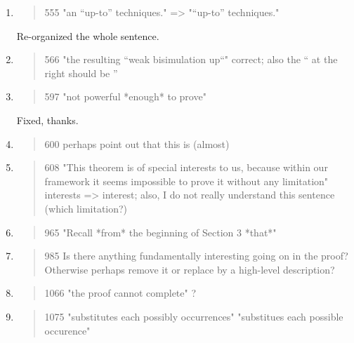 \begin{enumerate}
  \item \begin{quote}
555 "an “up-to” techniques." => "“up-to” techniques."
\end{quote}
  \Mark Re-organized the whole sentence.

  \item \begin{quote}
566 "the resulting ``weak bisimulation up``" correct; also the `` at the right should be ''
\end{quote}
  \Mark

  \item \begin{quote}
597 "not powerful *enough* to prove" 
\end{quote}
  \Mark Fixed, thanks.

  \item \begin{quote}
600 perhaps point out that this is (almost) 
\end{quote}
  \Mark

  \item \begin{quote}
608 "This theorem is of special interests to us, because within our framework it seems impossible to prove it without any limitation" interests => interest; also, I do not really understand this sentence (which limitation?)
\end{quote}
  \Mark

  \item \begin{quote}
965 "Recall *from* the beginning of Section 3 *that*"
\end{quote}
  \Mark

  \item \begin{quote}
985 Is there anything fundamentally interesting going on in the proof? Otherwise perhaps remove it or replace by a high-level description?
\end{quote}
  \Mark

  \item \begin{quote}
1066 "the proof cannot complete" ?
\end{quote}
  \Mark

  \item \begin{quote}
1075 "substitutes each possibly occurrences" "substitues each possible occurence"
\end{quote}
  \Mark


\end{enumerate}
